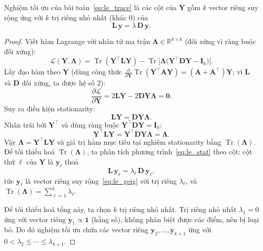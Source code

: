 \begin{theorem}\label{thm:le_solution}
Nghiệm tối ưu của bài toán~\eqref{eq:le_trace} là các cột của $\mathbf{Y}$
gồm $k$ vector riêng suy rộng ứng với $k$ trị riêng nhỏ nhất (khác $0$) của
\begin{equation}\label{eq:le_geig}
  \mathbf{L}\,\mathbf{y} = \lambda\,\mathbf{D}\,\mathbf{y}.
\end{equation}
\end{theorem}
\begin{proof}
Viết hàm Lagrange với nhân tử ma trận $\boldsymbol{\Lambda}\in\mathbb{R}^{k\times k}$
(đối xứng vì ràng buộc đối xứng):
\begin{equation*}
  \mathcal{L}(\mathbf{Y},\boldsymbol{\Lambda})
  = \operatorname{Tr}(\mathbf{Y}^\top\mathbf{L}\mathbf{Y})
  - \operatorname{Tr}\!\bigl[\boldsymbol{\Lambda}
    \bigl(\mathbf{Y}^\top\mathbf{D}\mathbf{Y}-\mathbf{I}_k\bigr)\bigr].
\end{equation*}
Lấy đạo hàm theo $\mathbf{Y}$ (dùng công thức $\frac{\partial}{\partial\mathbf{Y}}
\operatorname{Tr}(\mathbf{Y}^\top\mathbf{A}\mathbf{Y})=(\mathbf{A}+\mathbf{A}^\top)\mathbf{Y}$;
vì $\mathbf{L}$ và $\mathbf{D}$ đối xứng, ta được hệ số $2$):
\begin{equation*}
  \frac{\partial\mathcal{L}}{\partial\mathbf{Y}}
  = 2\mathbf{L}\mathbf{Y} - 2\mathbf{D}\mathbf{Y}\boldsymbol{\Lambda} = \mathbf{0}.
\end{equation*}
Suy ra điều kiện stationarity:
\begin{equation}\label{eq:le_stat}
  \mathbf{L}\mathbf{Y} = \mathbf{D}\mathbf{Y}\boldsymbol{\Lambda}.
\end{equation}
Nhân trái bởi $\mathbf{Y}^\top$ và dùng ràng buộc
$\mathbf{Y}^\top\mathbf{D}\mathbf{Y}=\mathbf{I}_k$:
\begin{equation*}
  \mathbf{Y}^\top\mathbf{L}\mathbf{Y}
  = \mathbf{Y}^\top\mathbf{D}\mathbf{Y}\boldsymbol{\Lambda}
  = \boldsymbol{\Lambda}.
\end{equation*}
Vậy $\boldsymbol{\Lambda} = \mathbf{Y}^\top\mathbf{L}\mathbf{Y}$ và giá trị
hàm mục tiêu tại nghiệm stationarity bằng
$\operatorname{Tr}(\boldsymbol{\Lambda})$.
Để tối thiểu hoá $\operatorname{Tr}(\boldsymbol{\Lambda})$, ta phân tích
phương trình~\eqref{eq:le_stat} theo cột: cột thứ $\ell$ của $\mathbf{Y}$
là $\mathbf{y}_\ell$ thoả
\begin{equation*}
  \mathbf{L}\,\mathbf{y}_\ell = \lambda_\ell\,\mathbf{D}\,\mathbf{y}_\ell,
\end{equation*}
tức $\mathbf{y}_\ell$ là vector riêng suy rộng~\eqref{eq:le_geig} với trị
riêng $\lambda_\ell$, và
$\operatorname{Tr}(\boldsymbol{\Lambda})=\sum_{\ell=1}^k\lambda_\ell$.
 
Để tối thiểu hoá tổng này, ta chọn $k$ trị riêng nhỏ nhất. Trị riêng nhỏ
nhất $\lambda_1=0$ ứng với vector riêng $\mathbf{y}_1\propto\mathbf{1}$ (hằng
số), không phân biệt được các điểm, nên bị loại bỏ. Do đó nghiệm tối ưu
chứa các vector riêng $\mathbf{y}_2,\ldots,\mathbf{y}_{k+1}$ ứng với
$0 < \lambda_2 \le \cdots \le \lambda_{k+1}$.
\end{proof}
 
